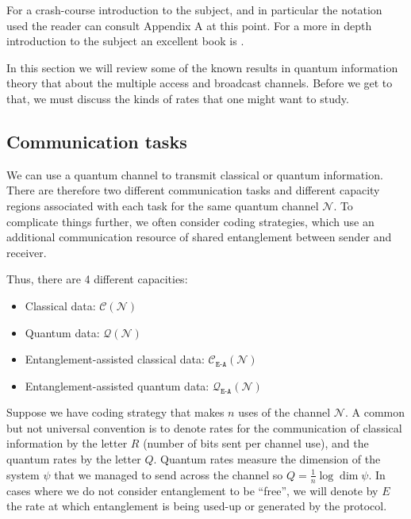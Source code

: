 \documentclass[aps,11pt,twoside,letterpaper]{article}
\begin{document}
	For a crash-course introduction to the subject, and in particular the notation
	used the reader can consult Appendix A at this point.
	For a more in depth introduction to the subject an excellent book is \cite{NC04}.


	In this section we will review some of the known results in quantum information theory
	that about the multiple access and broadcast channels. 
	Before we get to that, we must discuss the kinds of rates that one might want to study.


	\subsection{Communication tasks}
			
		We can use a quantum channel to transmit classical or quantum information.
		There are therefore two different communication tasks and different capacity regions
		associated with each task for the same quantum channel $\mathcal{N}$.
		To complicate things further, we often consider coding strategies, which use an additional
		communication resource of shared entanglement  between sender	and receiver.
		
		Thus, there are 4 different capacities:
		\begin{itemize}
			\item Classical data: $\mathcal{C}\!\left(\mathcal{N}\right)$ \vspace{-0.1in}
			\item Quantum data: $\mathcal{Q}\!\left(\mathcal{N}\right)$ \vspace{-0.1in}
			\item Entanglement-assisted classical data: $\mathcal{C}_{\texttt{E-A}}\!\left(\mathcal{N}\right)$ \vspace{-0.1in}
			\item Entanglement-assisted quantum data: $\mathcal{Q}_{\texttt{E-A}}\!\left(\mathcal{N}\right)$
		\end{itemize}
	
		Suppose we have coding strategy that makes $n$ uses of the channel $\mathcal{N}$.
		A common but not universal convention is to denote rates for the communication
		of classical information by the letter $R$ (number of bits sent per channel use),
		and the quantum rates by the letter $Q$. 
		Quantum rates measure the dimension of the system $\psi$ that we managed
		to send across the channel so $Q=\frac{1}{n}\log \dim \psi$.
		In cases where we do not consider entanglement to be ``free'', we will 
		denote by $E$ the rate at which entanglement is being used-up or generated
		by the protocol.
		
\end{document}
